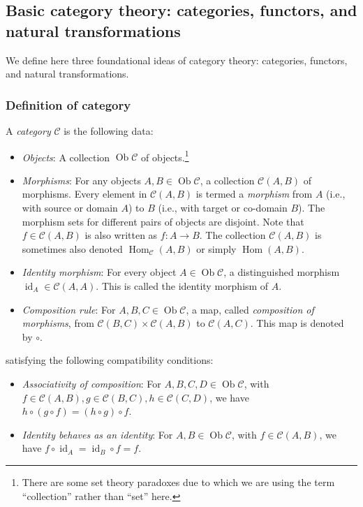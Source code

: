 \subsection{Basic category theory: categories, functors, and natural transformations}\label{appsec:category}

We define here three foundational ideas of category theory:
categories, functors, and natural transformations.

\subsubsection{Definition of category}

A {\em category} $\mathcal{C}$ is the following data:

\begin{itemize}
\item {\em Objects}: A collection $\operatorname{Ob}\mathcal{C}$ of
  objects.\footnote{There are some set theory paradoxes due to which
    we are using the term ``collection'' rather than ``set'' here.}
\item {\em Morphisms}: For any objects $A,B \in
  \operatorname{Ob}\mathcal{C}$, a collection $\mathcal{C}(A,B)$ of
  morphisms. Every element in $\mathcal{C}(A,B)$ is termed a {\em
    morphism} from $A$ (i.e., with source or domain $A$) to $B$ (i.e.,
  with target or co-domain $B$). The morphism sets for different pairs
  of objects are disjoint. Note that $f \in \mathcal{C}(A,B)$ is also
  written as $f:A \to B$. The collection $\mathcal{C}(A,B)$ is
  sometimes also denoted $\operatorname{Hom}_{\mathcal{C}}(A,B)$ or
  simply $\operatorname{Hom}(A,B)$.
\item {\em Identity morphism}: For every object $A \in
  \operatorname{Ob}\mathcal{C}$, a distinguished morphism
  $\operatorname{id}_A \in \mathcal{C}(A,A)$. This is called the
  identity morphism of $A$.
\item {\em Composition rule}: For $A,B,C \in
  \operatorname{Ob}\mathcal{C}$, a map, called {\em composition of
  morphisms}, from $\mathcal{C}(B,C) \times \mathcal{C}(A,B)$ to
  $\mathcal{C}(A,C)$. This map is denoted by $\circ$.
\end{itemize}

satisfying the following compatibility conditions:

\begin{itemize}
\item {\em Associativity of composition}: For $A,B,C,D \in
  \operatorname{Ob}\mathcal{C}$, with $f \in \mathcal{C}(A,B), g \in
  \mathcal{C}(B,C), h \in \mathcal{C}(C,D)$, we have $h \circ (g \circ
  f) = (h \circ g) \circ f$.
\item {\em Identity behaves as an identity}: For $A,B \in
  \operatorname{Ob}\mathcal{C}$, with $f \in \mathcal{C}(A,B)$, we
  have $f \circ \operatorname{id}_A = \operatorname{id}_B \circ f =
  f$.
\end{itemize}

